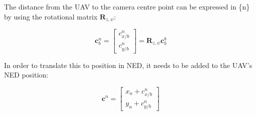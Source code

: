 \documentclass{article}
\begin{document}
The distance from the UAV to the camera centre point can be expressed in \{n\} by using the rotational matrix $\bm{R}_{z,\psi}$:

\begin{equation}
	\bm{c}^n_b = 
	\begin{bmatrix}
		c^n_{x/b} \\ c^n_{y/b}
	\end{bmatrix}
	= \bm{R}_{z, \psi}\bm{c}^b_b
\end{equation}

In order to translate this to position in NED, it needs to be added to the UAV's NED position:

\begin{equation}
	\bm{c}^n =
	\begin{bmatrix}
		x_n + c^n_{x/b} \\
		y_n + c^n_{y/b}
	\end{bmatrix}
\end{equation}
\end{document}
